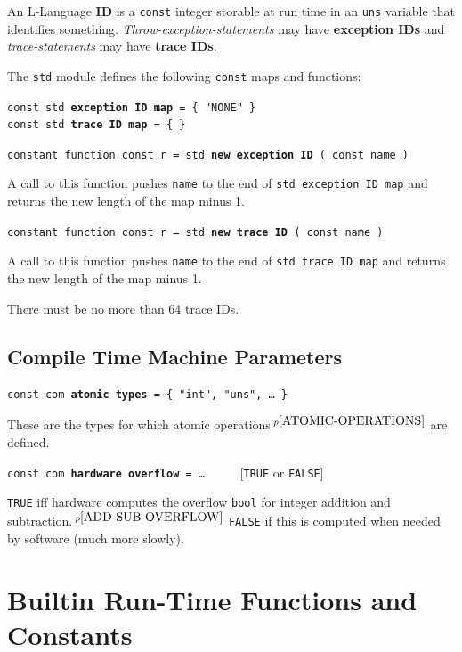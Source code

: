 \documentclass[12pt]{article}
\newcommand{\key}[1]{{\rm \bfseries #1}}
\newcommand{\ttkey}[1]{{\tt \bfseries #1}}
\newcommand{\skey}[2]{{\rm \bfseries #1#2}}
\newcommand{\pagnote}[1]{$\,^{p\pageref{#1}}$}
\newenvironment{indpar}[1][0.3in]%
	{\begin{list}{}%
		     {\setlength{\itemsep}{0in}%
		      \setlength{\topsep}{0in}%
		      \setlength{\parsep}{1ex}%
		      \setlength{\labelwidth}{#1}%
		      \setlength{\leftmargin}{#1}%
		      \addtolength{\leftmargin}{\labelsep}}%
	 \item}%
	{\end{list}}
\begin{document}
An L-Language \key{ID} is a {\tt const} integer storable
at run time in an {\tt uns} variable that identifies something.
{\em Throw-exception-statements} may have \skey{exception ID}s
and {\em trace-statements} may have \skey{trace ID}s.

The {\tt std} module defines the following {\tt const} maps and functions:

{\tt const std \ttkey{exception ID map} = \{ "NONE" \} } \\
{\tt const std \ttkey{trace ID map} = \{ \}}

{\tt constant function const r = std \ttkey{new exception ID} ( const name ) }%
\label{NEW-EXCEPTION-ID}
\begin{indpar}
A call to this function pushes {\tt name} to the end of
{\tt std exception ID map} and returns the new length of the map minus 1.
\end{indpar}

{\tt constant function const r = std \ttkey{new trace ID} ( const name ) }%
\label{NEW-TRACE-ID}
\begin{indpar}
A call to this function pushes {\tt name} to the end of
{\tt std trace ID map} and returns the new length of the map minus 1.

There must be no more than 64 trace IDs.

\end{indpar}


\subsection{Compile Time Machine Parameters}

{\tt const com \ttkey{atomic types} = \{ "int", "uns", \ldots{} \}}%
\label{ATOMIC-TYPES}
\begin{indpar}
These are the types for which atomic operations\pagnote{ATOMIC-OPERATIONS}
are defined.
\end{indpar}

{\tt const com \ttkey{hardware overflow} =
    \ldots{}} ~~~~~[{\tt TRUE} or {\tt FALSE}]%
\label{HARDWARE-OVERFLOW}
\begin{indpar}
{\tt TRUE} iff hardware computes the overflow {\tt bool} for integer
addition and subtraction.\pagnote{ADD-SUB-OVERFLOW}
{\tt FALSE} if this is computed when needed by software
(much more slowly).
\end{indpar}

\section{Builtin Run-Time Functions and Constants}
\end{document}
